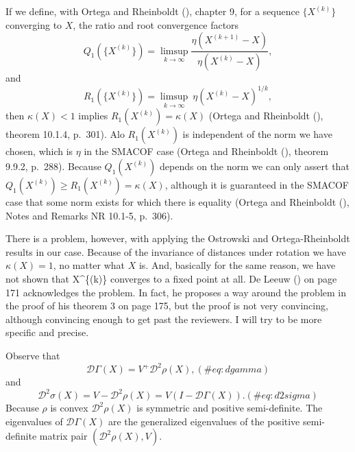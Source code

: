 \documentclass[
  12pt,
  letterpaper,
  DIV=11,
  numbers=noendperiod]{scrartcl}
\begin{document}
If we define, with Ortega and Rheinboldt
(), chapter 9, for a sequence
\(\{X^{(k)}\}\) converging to \(X\), the ratio and root convergence
factors \begin{equation}
Q_1(\{X^{(k)}\})=\limsup_{k\rightarrow\infty}\frac{\eta(X^{(k+1)}-X)}{\eta(X^{(k)}-X)},
\end{equation} and \begin{equation}
R_1(\{X^{(k)}\})=\limsup_{k\rightarrow\infty}\ \eta(X^{(k)}-X)^{1/k},
\end{equation} then \(\kappa(X)<1\) implies \(R_1(X^{(k)})=\kappa(X)\)
(Ortega and Rheinboldt (),
theorem 10.1.4, p.~301). Alo \(R_1(X^{(k)})\) is independent of the norm
we have chosen, which is \(\eta\) in the SMACOF case (Ortega and
Rheinboldt (), theorem 9.9.2,
p.~288). Because \(Q_1(X^{(k)})\) depends on the norm we can only assert
that \(Q_1(X^{(k)})\geq R_1(X^{(k)})=\kappa(X)\), although it is
guaranteed in the SMACOF case that some norm exists for which there is
equality (Ortega and Rheinboldt
(), Notes and Remarks NR
10.1-5, p.~306).

There is a problem, however, with applying the Ostrowski and
Ortega-Rheinboldt results in our case. Because of the invariance of
distances under rotation we have \(\kappa(X)=1\), no matter what \(X\)
is. And, basically for the same reason, we have not shown that
X\^{}\{(k)\} converges to a fixed point at all. De Leeuw
() on page 171 acknowledges the
problem. In fact, he proposes a way around the problem in the proof of
his theorem 3 on page 175, but the proof is not very convincing,
although convincing enough to get past the reviewers. I will try to be
more specific and precise.

Observe that \begin{equation}
\mathcal{D}\Gamma(X)=V^+\mathcal{D}^2\rho(X),
(\#eq:dgamma)
\end{equation} and \begin{equation}
\mathcal{D}^2\sigma(X)=V-\mathcal{D}^2\rho(X)=V(I-\mathcal{D}\Gamma(X)).
(\#eq:d2sigma)
\end{equation} Because \(\rho\) is convex \(\mathcal{D}^2\rho(X)\) is
symmetric and positive semi-definite. The eigenvalues of
\(\mathcal{D}\Gamma(X)\) are the generalized eigenvalues of the positive
semi-definite matrix pair \((\mathcal{D}^2\rho(X),V)\).
\end{document}
